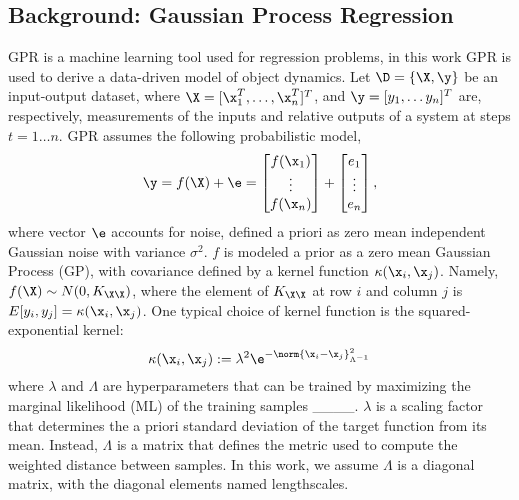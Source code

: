 \subsection{Background: Gaussian Process Regression}
\label{sec:gp}


GPR is a machine learning tool used for regression problems, in this work GPR is used to derive a data-driven model of object dynamics.
Let $\D = \{\X, \y\}$ be an input-output dataset, where 
$\X = [{\x}_1^T, \dots, {\x}_n^T]^T$, and $\y=[y_1, \dots y_n]^T$ are, respectively, measurements of the inputs and relative outputs of a system at steps $t = 1 \dots n$.
GPR assumes the following probabilistic model,
\begin{equation}
    \y = f({\X}) + \e = \begin{bmatrix}
        f({\x}_1) \\ \vdots \\ f({\x}_n)
    \end{bmatrix} + \begin{bmatrix}
        {e}_1 \\ \vdots \\ {e}_n
    \end{bmatrix},
\end{equation}
where vector $\e$ accounts for noise, defined a priori as zero mean independent Gaussian noise with variance $\sigma^2$. $f$ is modeled a prior as a zero mean Gaussian Process (GP), with covariance defined by a kernel function $\kappa({\x}_{i},{\x}_{j})$. Namely,  $f({\X}) \sim N(0, K_{{\X} {\X}})$, where the element of $K_{{\X} {\X}}$ at row $i$ and column $j$ is $E[y_{i}, y_{j}] = \kappa({\x}_{i},{\x}_{j})$. 
One typical choice of kernel function is the squared-exponential kernel: 
\begin{equation}\label{eq:se-kernel}
    \kappa({\x}_{i}, {\x}_{j}):= \lambda^2 \e^{-\norm{{\x}_{i}- {\x}_{j}}^2_{\Lambda^{-1}}}
\end{equation}
where $\lambda$ and $\Lambda$ are hyperparameters that can be trained by maximizing the marginal likelihood (ML) of the training samples ____.
$\lambda$ is a scaling factor that determines the a priori standard deviation of the target function from its mean. Instead, $\Lambda$ is a matrix that defines the metric used to compute the weighted distance between samples. In this work, we assume $\Lambda$  is a diagonal matrix, with the diagonal elements named lengthscales.%

